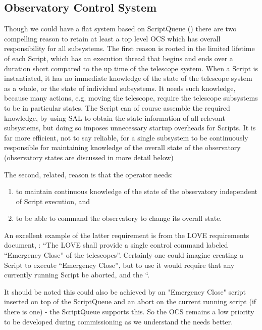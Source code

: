 \subsection{Observatory Control System } \label{sect:ocs}
Though we could have a flat system based on ScriptQueue ()
there are two compelling reason to retain at least a top level OCS which has
overall responsibility for all subsystems. The first reason is rooted in the limited lifetime of each
Script, which has an execution thread that begins and ends over a duration short compared to
the up time of the telescope system. When a Script is instantiated, it has no immediate
knowledge of the state of the telescope system as a whole, or the state of individual
subsystems. It needs such knowledge, because many actions, e.g. moving the telescope,
require the telescope subsystems to be in particular states. The Script can of course assemble
the required knowledge, by using SAL to obtain the state information of all relevant subsystems,
but doing so imposes unnecessary startup overheads for Scripts. It is far more efficient, not to
say reliable, for a single subsystem to be continuously responsible for maintaining knowledge of
the overall state of the observatory (observatory states are discussed in more detail below)

The second, related, reason is that the operator needs:
\begin{enumerate}
\item to maintain continuous knowledge of
the state of the observatory independent of Script execution, and
\item  to be able to command the
observatory to change its overall state.
\end{enumerate}
An excellent example of the latter requirement is from
the LOVE requirements document, : “The LOVE shall provide a single control
command labeled “Emergency Close” of the telescopes”. Certainly one could imagine creating
a Script to execute “Emergency Close”, but to use it would require that any currently running
Script be aborted, and the “.

It should be noted this could also be achieved by an "Emergency Close" script inserted on top of the ScriptQueue and an abort on the current running script (if there is one) - the ScriptQueue supports this.  So the OCS remains a low priority to be developed during commissioning as we understand the needs better.
